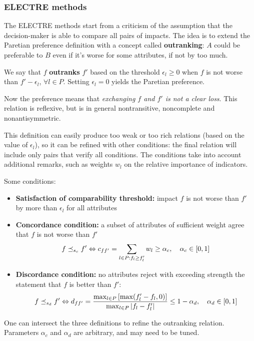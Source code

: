 \subsubsection{ELECTRE methods}

The ELECTRE methods start from a criticism of the assumption that the decision-maker is able to compare all pairs of impacts. The idea is to extend the Paretian preference definition with a concept called \textbf{outranking}: $A$ could be preferable to $B$ even if it's worse for some attributes, if not by too much.

We say that $f$ \textbf{outranks} $f'$ based on the threshold $\epsilon_l \geq 0$ when $f$ is not worse than $f' - \epsilon_l$, $\forall l \in P$. Setting $\epsilon_l = 0$ yields the Paretian preference. 

Now the preference means that \textit{exchanging $f$ and $f'$ is not a clear loss}. This relation is reflexive, but is in general nontransitive, noncomplete and nonantisymmetric.

This definition can easily produce too weak or too rich relations (based on the value of $\epsilon_l$), so it can be refined with other conditions: the final relation will include only pairs that verify all conditions. The conditions take into account additional remarks, such as weights $w_l$ on the relative importance of indicators.

Some conditions: 
\begin{itemize}
	\item \textbf{Satisfaction of comparability threshold:} impact $f$ is not worse than $f'$ by more than $\epsilon_l$ for all attributes
	
	\item \textbf{Concordance condition:} a subset of attributes of sufficient weight agree that $f$ is not worse than $f'$
	$$ f \preceq_{s_c} f' \Leftrightarrow c_{ff'} = \sum_{l \in P: f_l \geq f_l'} w_l \geq \alpha_c, \quad \alpha_c \in [0,1] $$
	
	\item \textbf{Discordance condition:} no attributes reject with exceeding strength the statement that $f$ is better than $f'$:
	$$ f \preceq_{s_d} f' \Leftrightarrow d_{ff'} = \frac{\max_{l \in P} \left[\max (f_l' - f_l, 0)\right]}{\max_{l \in P} |f_l - f_l'|} \leq 1 - \alpha_d, \quad \alpha_d \in [0,1] $$
\end{itemize}
One can intersect the three definitions to refine the outranking relation. Parameters $\alpha_c$  and $\alpha_d$ are arbitrary, and may need to be tuned.


